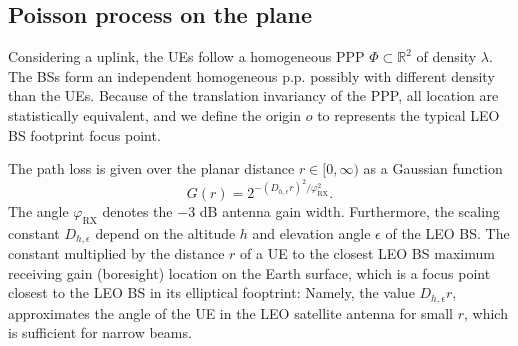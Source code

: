 \documentclass[lettersize,journal]{IEEEtran}
\newcommand{\R}{\mathbb{R}}
\newtheorem*{remark}{Remark}
\begin{document}
\label{sec:analysissec}




\subsection{Poisson process on the plane}
\label{sec:gainprocess}


Considering a uplink, the UEs follow a homogeneous PPP $\Phi \subset \R^2$ of density $\lambda$. The BSs form an independent homogeneous p.p. possibly with different density than the UEs. Because of the translation invariancy of the PPP, all location are statistically equivalent, and we define the origin $\textit{o}$ to represents the typical LEO BS footprint focus point.

The path loss is given over the planar distance $r \in [0, \infty)$ as a Gaussian function
  \begin{equation}
    \label{eq:Gaussianantpat}
    G(r) = 2^{-(D_{h,\epsilon}r)^2 / \varphi_{\text{RX}}^2}.
  \end{equation}
  The angle $\varphi_{\text{RX}}$ denotes the $-3$ dB antenna gain width. Furthermore, the scaling constant $D_{h,\epsilon}$ depend on the altitude $h$ and elevation angle $\epsilon$ of the LEO BS. The constant multiplied by the distance $r$ of a UE to the closest LEO BS maximum receiving gain (boresight) location on the Earth surface, which is a focus point closest to the LEO BS in its elliptical fooptrint: Namely, the value $D_{h,\epsilon}r$, approximates the angle of the UE in the LEO satellite antenna for small $r$, which is sufficient for narrow beams. %


\end{document}
